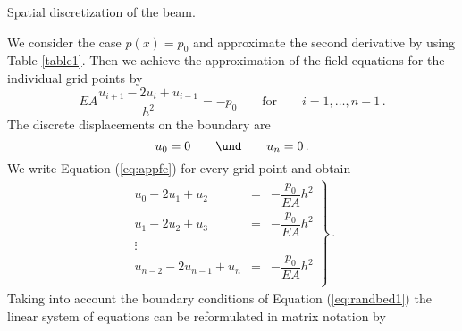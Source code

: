 \begin{Figure}[htb]
\begin{center}

\caption{Spatial discretization of the beam.}
\label{fig303}
\end{center}
\end{Figure}
%
We consider the case $p(x)=p_0$ and approximate the 
second derivative by using Table \ref{table1}. 
Then we achieve the approximation 
of the field equations for the individual grid points by 
%
\begin{equation}
 EA \frac{u_{i+1} - 2u_i + u_{i-1}}{h^2} = -p_0 
 \qquad \mbox{for} \qquad i=1,\dots,n-1 \, .
\label{eq:appfe}
\end{equation}
%
The discrete displacements on the boundary are 
%
\begin{equation}
u_0 = 0 \qquad \und \qquad u_{n} = 0 \, .
\label{eq:randbed1}
\end{equation}
%
We write Equation (\ref{eq:appfe}) for every grid point 
and obtain 
%
\begin{eqnarray}
\left.
\begin{array}{rcl}
u_0 - 2 u_1 + u_2 & = & - \dfrac{p_0}{EA} h^2 \\ [1.1ex]
u_1 - 2 u_2 + u_3 & = & - \dfrac{p_0}{EA} h^2 \\ [1.1ex]
\vdots & & \\
u_{n-2} - 2 u_{n-1} + u_{n} & = & - \dfrac{p_0}{EA} h^2 \\
\end{array}
\right\} \, .
\end{eqnarray}
%
Taking into account the boundary 
conditions of Equation (\ref{eq:randbed1}) 
the linear system of equations can be reformulated in 
matrix notation by 
%
